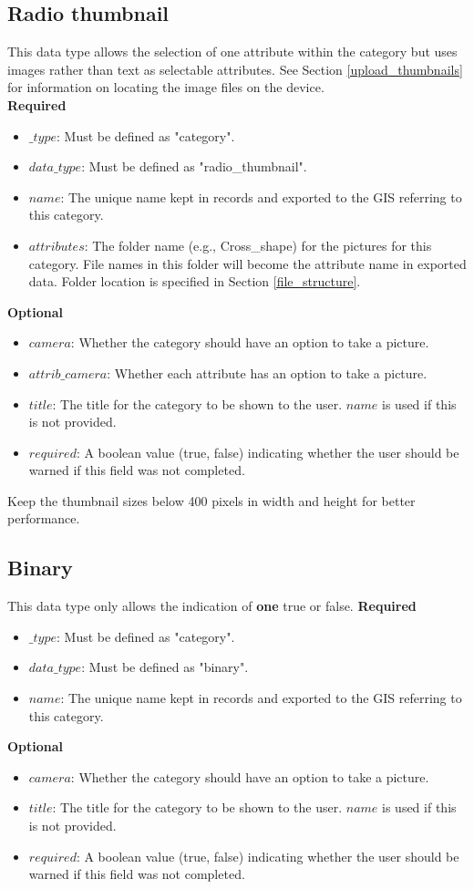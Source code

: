 \documentclass{scrreprt}
\begin{document}
\subsection{Radio thumbnail}
This data type allows the selection of one attribute within the category but uses images rather than text as selectable attributes. See Section \ref{upload_thumbnails} for information on locating the image files on the device.\\
\textbf{Required}
\begin{itemize}
\item $\_type$:  Must be defined as "category".
\item $data\_type$: Must be defined as "radio_thumbnail".
\item $name$: The unique name kept in records and exported to the GIS referring to this category.
\item $attributes$: The folder name (e.g., Cross_shape) for the pictures for this category. File names in this folder will become the attribute name in exported data. Folder location is specified in Section \ref{file_structure}.
\end{itemize}
\textbf{Optional}
\begin{itemize}
\item $camera$: Whether the category should have an option to take a picture.
\item $attrib\_camera$: Whether each attribute has an option to take a picture.
\item $title$: The title for the category to be shown to the user. $name$ is used if this is not provided.
\item $required$: A boolean value (true, false) indicating whether the user should be warned if this field was not completed.
\end{itemize}
Keep the thumbnail sizes below 400 pixels in width and height for better performance.


\newpage
\subsection{Binary}
This data type only allows the indication of \textbf{one} true or false.
\textbf{Required}
\begin{itemize}
\item $\_type$:  Must be defined as "category".
\item $data\_type$: Must be defined as "binary".
\item $name$: The unique name kept in records and exported to the GIS referring to this category.
\end{itemize}
\textbf{Optional}
\begin{itemize}
\item $camera$: Whether the category should have an option to take a picture.
\item $title$: The title for the category to be shown to the user. $name$ is used if this is not provided.
\item $required$: A boolean value (true, false) indicating whether the user should be warned if this field was not completed.
\end{itemize}
\end{document}
